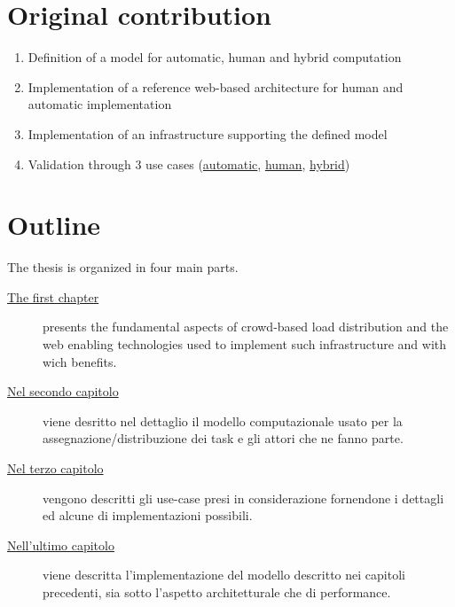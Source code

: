 \section*{Original contribution}
\begin{enumerate}
	\item Definition of a model for automatic, human and hybrid computation
	\item Implementation of a reference web-based architecture for human and automatic implementation
	\item Implementation of an infrastructure supporting the defined model
	\item Validation through 3 use cases (\hyperref[sec:cases:automatic]{automatic},
	\hyperref[sec:cases:human]{human}, \hyperref[sec:cases:hybrid]{hybrid})
\end{enumerate}

\section*{Outline}
The thesis is organized in four main parts.

\begin{description}
\item[{\hyperref[cap:bg]{The first chapter}}]
presents the fundamental aspects of crowd-based load distribution and the web enabling
technologies used to implement such infrastructure and with wich benefits.

\item[{\hyperref[cap:model]{Nel secondo capitolo}}]
viene desritto nel dettaglio il modello computazionale usato per la assegnazione/distribuzione dei task
e gli attori che ne fanno parte.

\item[{\hyperref[cap:cases]{Nel terzo capitolo}}]
vengono descritti gli use-case presi in considerazione fornendone i dettagli ed alcune di implementazioni possibili.

\item[{\hyperref[cap:implementation]{Nell'ultimo capitolo}}]
viene descritta l'implementazione del modello descritto nei capitoli precedenti, sia sotto l'aspetto architetturale
che di performance.

\end{description}